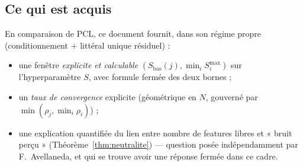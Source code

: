 \documentclass[12pt,a4paper]{article}
\theoremstyle{remark}
\begin{document}
\subsection{Ce qui est acquis}

En comparaison de PCL, ce document fournit, dans son régime propre (conditionnement
$+$ littéral unique résiduel) :
\begin{itemize}
  \item une fenêtre \emph{explicite et calculable} $(S_{\text{bas}}(j), \min_i
  S_i^{\max})$ sur l'hyperparamètre $S$, avec formule fermée des deux bornes ;
  \item un \emph{taux de convergence} explicite (géométrique en $N$, gouverné par
  $\min(\rho_j, \min_i \rho_i)$) ;
  \item une explication quantifiée du lien entre nombre de features libres et
  « bruit perçu » (Théorème~\ref{thm:neutralite}) --- question posée
  indépendamment par F.~Avellaneda, et qui se trouve avoir une réponse fermée dans
  ce cadre.
\end{itemize}
\end{document}
